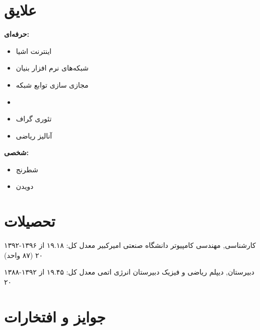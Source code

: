 \documentclass[]{friggeri-cv-fa} %
\begin{document}
\section{علایق}
\textbf{حرفه‌ای:}
\begin{itemize}
	\item اینترنت اشیا
	\item شبکه‌های نرم افزار بنیان
	\item مجازی سازی توابع شبکه
	\item {}
	\item تئوری گراف
	\item آنالیز ریاضی
\end{itemize}
\textbf{شخصی:}
\begin{itemize}	
	\item شطرنج
	\item دویدن
\end{itemize}



\section{تحصیلات}

\begin{entrylist}


\entry
{۱۳۹۲-۱۳۹۶}
{کارشناسی, {\normalfont مهندسی کامپیوتر}}
{دانشگاه صنعتی امیرکبیر}
{معدل کل: ۱۹.۱۸ از ۲۰ (۸۷ واحد)}


\entry
{۱۳۸۸-۱۳۹۲}
{دبیرستان, {\normalfont دیپلم ریاضی و فیزیک}}
{دبیرستان انرژی اتمی}
{معدل کل: ۱۹.۴۵ از ۲۰}



\end{entrylist}


\section{جوایز و افتخارات}
\end{document}

